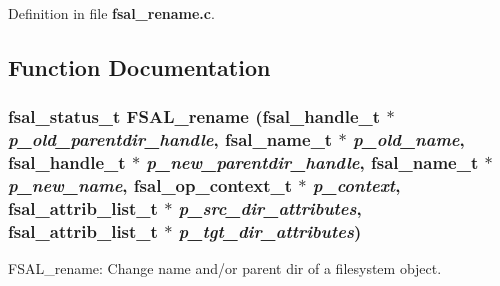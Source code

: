 Definition in file {\bf fsal\_\-rename.c}.

\subsection{Function Documentation}
\subsubsection[{FSAL\_\-rename}]{\setlength{\rightskip}{0pt plus 5cm}fsal\_\-status\_\-t FSAL\_\-rename (fsal\_\-handle\_\-t $\ast$ {\em p\_\-old\_\-parentdir\_\-handle}, \/  fsal\_\-name\_\-t $\ast$ {\em p\_\-old\_\-name}, \/  fsal\_\-handle\_\-t $\ast$ {\em p\_\-new\_\-parentdir\_\-handle}, \/  fsal\_\-name\_\-t $\ast$ {\em p\_\-new\_\-name}, \/  fsal\_\-op\_\-context\_\-t $\ast$ {\em p\_\-context}, \/  fsal\_\-attrib\_\-list\_\-t $\ast$ {\em p\_\-src\_\-dir\_\-attributes}, \/  fsal\_\-attrib\_\-list\_\-t $\ast$ {\em p\_\-tgt\_\-dir\_\-attributes})}\label{fsal__rename_8c_c35cd0c935bdabe6ed3d52845a0e2266}


FSAL\_\-rename: Change name and/or parent dir of a filesystem object.

